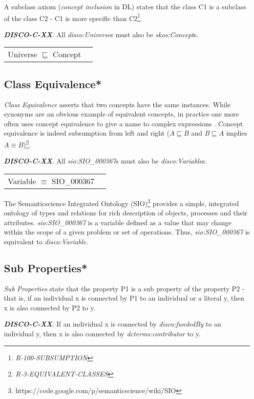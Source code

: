 \documentclass{elsart3p}    %
\newenvironment{DL}{
  \vspace{0cm}
  \begin{tabular}{l l}

}{
  \end{tabular}
}
\begin{document}
A subclass axiom ({\em concept inclusion} in DL) states that the class C1 is a subclass of the class C2 - C1 is more specific than C2\footnote{{\em R-100-SUBSUMPTION}}.

\textbf{{\em DISCO-C-XX}}. 
All {\em disco:Universe}s must also be {\em skos:Concept}s.

\begin{DL}
Universe $\sqsubseteq$ Concept
\end{DL}

\subsection{Class Equivalence*}

{\em Class Equivalence} asserts that two concepts have the same instances.
While synonyms are an obvious example of equivalent concepts, in practice one more
often uses concept equivalence to give a name to complex expressions \cite{Kroetzsch2012}.
Concept equivalence is indeed subsumption from left and right ($A \sqsubseteq B$ and $B \sqsubseteq A$ implies $A \equiv B$)\footnote{{\em R-3-EQUIVALENT-CLASSES}}.

\textbf{{\em DISCO-C-XX}}. 
All {\em sio:SIO\_000367}s must also be {\em disco:Variable}s.

\begin{DL}
Variable $\equiv$ SIO\_000367
\end{DL}

The Semanticscience Integrated Ontology (SIO)\footnote{https://code.google.com/p/semanticscience/wiki/SIO} provides a simple, integrated ontology of types and relations for rich description of objects, processes and their attributes.
{\em sio:SIO\_000367} is a variable defined as a value that may change within the scope of a given problem or set of operations.
Thus, {\em sio:SIO\_000367} is equivalent to {\em disco:Variable}.

\subsection{Sub Properties*}

{\em Sub Properties} state that the property P1 is a sub property of the property P2 - that is, if an individual x is connected by P1 to an individual or a literal y, then x is also connected by P2 to y. 

\textbf{{\em DISCO-C-XX}}. 
If an individual x is connected by {\em disco:fundedBy} to an individual y, then x is also connected by {\em dcterms:contributor} to y. 
\end{document}
